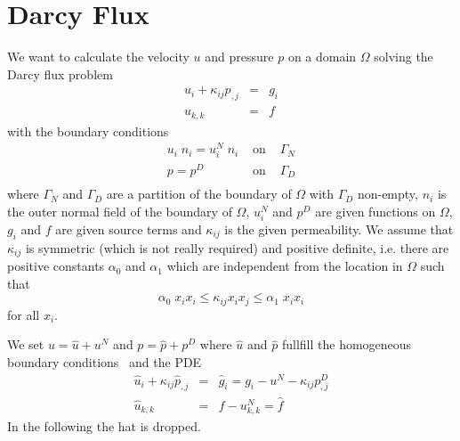 
%
%
%

\section{Darcy Flux}
\label{DARCY FLUX}
We want to calculate the velocity $u$ and pressure $p$ on a domain $\Omega$
solving the Darcy flux problem
\begin{equation}\label{DARCY PROBLEM}
\begin{array}{rcl}
u_{i} + \kappa_{ij} p_{,j} & = & g_{i} \\
u_{k,k} & = & f
\end{array}
\end{equation} 
with the boundary conditions
\begin{equation}\label{DARCY BOUNDARY}
\begin{array}{rcl}
u_{i} \; n_{i}  = u^{N}_{i}  \; n_{i} & \mbox{ on } & \Gamma_{N} \\
p = p^{D} &  \mbox{ on } & \Gamma_{D} \\ 
\end{array}
\end{equation} 
where $\Gamma_{N}$ and $\Gamma_{D}$ are a partition of the boundary of
$\Omega$ with $\Gamma_{D}$ non-empty, $n_{i}$ is the outer normal field of the
boundary of $\Omega$, $u^{N}_{i}$ and $p^{D}$ are given functions on $\Omega$,
$g_{i}$ and $f$ are given source terms and $\kappa_{ij}$ is the given
permeability.
We assume that $\kappa_{ij}$ is symmetric (which is not really required) and
positive definite, i.e. there are positive constants $\alpha_{0}$ and
$\alpha_{1}$ which are independent from the location in $\Omega$ such that
\begin{equation}
\alpha_{0} \; x_{i} x_{i} \le \kappa_{ij} x_{i} x_{j} \le \alpha_{1} \; x_{i} x_{i}
\end{equation}
for all $x_{i}$.

We set $u=\hat{u}+u^{N}$ and
$p=\hat{p}+p^D$ where $\hat{u}$ and $\hat{p}$ fullfill the homogeneous boundary conditions~\label{DARCY BOUNDARY} and
the PDE
\begin{equation}\label{DARCY PROBLEM 2}
\begin{array}{rcl}
\hat{u}_{i} + \kappa_{ij} \hat{p}_{,j} & = & \hat{g}_{i} = g_{i} -u^{N} - \kappa_{ij} p^D_{,j} \\
\hat{u}_{k,k} & = & f - u^N_{k,k} = \hat{f} 
\end{array}
\end{equation} 
In the following the hat is dropped.


